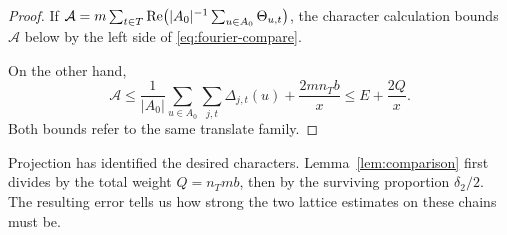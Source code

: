 \begin{proof}
If \(\mathcal A=m\sum_{t\in T}\operatorname{Re}\bigl(|A_0|^{-1}
                  \sum_{u\in A_0}\Theta_{u,t}\bigr)\),
the character calculation bounds \(\mathcal A\) below by the left
side of \eqref{eq:fourier-compare}. 

On the other hand,
\[
 \mathcal A\le \frac1{|A_0|}\sum_{u\in A_0}
                \sum_{j,t}\Delta_{j,t}(u) + \frac{2mn_Tb}{x}
             \le E+\frac{2Q}{x}.
\]
Both bounds refer to the same translate family.
\end{proof}

Projection has identified the desired characters. Lemma~\ref{lem:comparison} first divides by the total weight \(Q=n_Tmb\), then by the surviving proportion \(\delta_2/2\). The resulting error tells us how strong the two lattice estimates on these chains must be.
